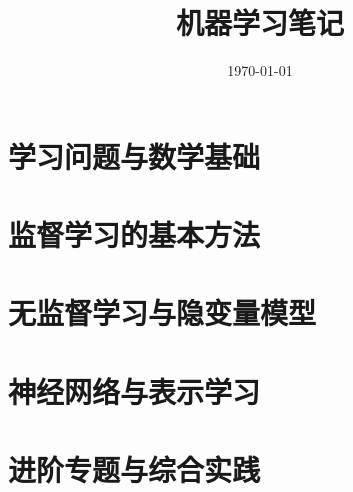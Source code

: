 \documentclass[UTF8,12pt,a4paper,fontset=fandol]{ctexbook}
\title{机器学习笔记}
\author{}
\date{\today}
\begin{document}
\frontmatter %


\maketitle
\tableofcontents
\clearpage


\mainmatter

\part{学习问题与数学基础}







\part{监督学习的基本方法}








\part{无监督学习与隐变量模型}




\part{神经网络与表示学习}



\part{进阶专题与综合实践}








\appendix
\end{document}
